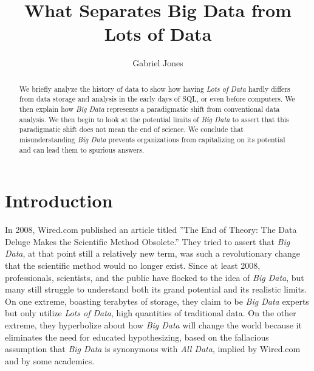 \documentclass[sigconf]{acmart}
\begin{document}
\title{What Separates Big Data from Lots of Data }


\author{Gabriel Jones}

\renewcommand{\shortauthors}{G. Jones}


\begin{abstract}
We briefly analyze the history of data to show how having {\em Lots of Data} hardly differs from data storage and analysis in the early days of SQL, or even before computers. We then explain how {\em Big Data} represents a paradigmatic shift from conventional data analysis. We then begin to look at the potential limits of {\em Big Data} to assert that this paradigmatic shift does not mean the end of science. We conclude that misunderstanding {\em Big Data} prevents organizations from capitalizing on its potential and can lead them to spurious answers.
\end{abstract}


\maketitle

\section{Introduction}
In 2008, Wired.com published an article titled ''The End of Theory: The Data Deluge Makes the Scientific Method Obsolete.'' They tried to assert that {\em Big Data}, at that point still a relatively new term, was such a revolutionary change that the scientific method would no longer exist.\cite{Wired} Since at least 2008, professionals, scientists, and the public have flocked to the idea of {\em Big Data}, but many still struggle to understand both its grand potential and its realistic limits.\cite{Marr2} On one extreme, boasting terabytes of storage, they claim to be {\em Big Data} experts but only utilize {\em Lots of Data}, high quantities of traditional data. On the other extreme, they hyperbolize about how {\em Big Data} will change the world because it eliminates the need for educated hypothesizing, based on the fallacious assumption that {\em Big Data} is synonymous with {\em All Data}, implied by Wired.com and by some academics.\cite{Keystone}
\end{document}
